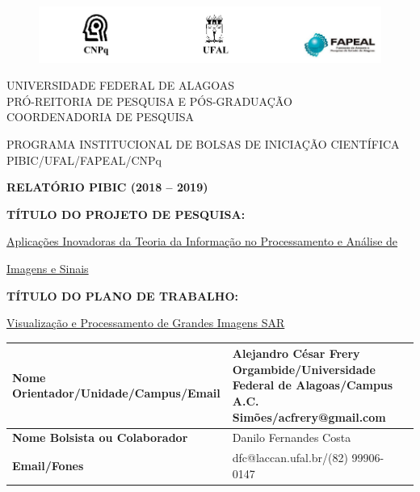 \documentclass[12pt,letterpaper]{article}
\begin{document}
\onehalfspacing 
\thispagestyle{empty}
\begin{center}
\vspace{0.2cm}

\begin{figure}
    \centering
    \includegraphics[width = \linewidth]{header.png}
\end{figure}
\vspace{-1cm}
\hrulefill

UNIVERSIDADE FEDERAL DE ALAGOAS\\
PRÓ-REITORIA DE PESQUISA E PÓS-GRADUAÇÃO\\
COORDENADORIA DE PESQUISA

\hrulefill

\vspace{0.5cm}

PROGRAMA INSTITUCIONAL DE BOLSAS DE INICIAÇÃO CIENTÍFICA\\PIBIC/UFAL/FAPEAL/CNPq

\vspace{1.0cm}

\textbf{RELATÓRIO PIBIC (2018 -- 2019)}\\

\end{center}

\vspace{1.2cm}

\textbf{TÍTULO DO PROJETO DE PESQUISA:}

\underline{Aplicações Inovadoras da Teoria da Informação no Processamento e Análise de}

\underline{Imagens e Sinais}

\textbf{TÍTULO DO PLANO DE TRABALHO:}

\underline{Visualização e Processamento de Grandes Imagens SAR}

\vspace{1cm}

\begin{table}[!h]
\begin{center}
\begin{tabularx}{\textwidth}{|X|X|X|}
\hline                              
\textbf{Nome Orientador/Unidade/Campus/Email} &  Alejandro César Frery Orgambide/Universidade Federal de Alagoas/Campus A.C. Simões/acfrery@gmail.com\\
\hline     
\textbf{Nome Bolsista ou Colaborador} & Danilo Fernandes Costa\\
\hline     
\textbf{Email/Fones} & dfc@laccan.ufal.br/(82) 99906-0147\\
\hline     
\end{tabularx}
\end{center}
\end{table}
\end{document}
